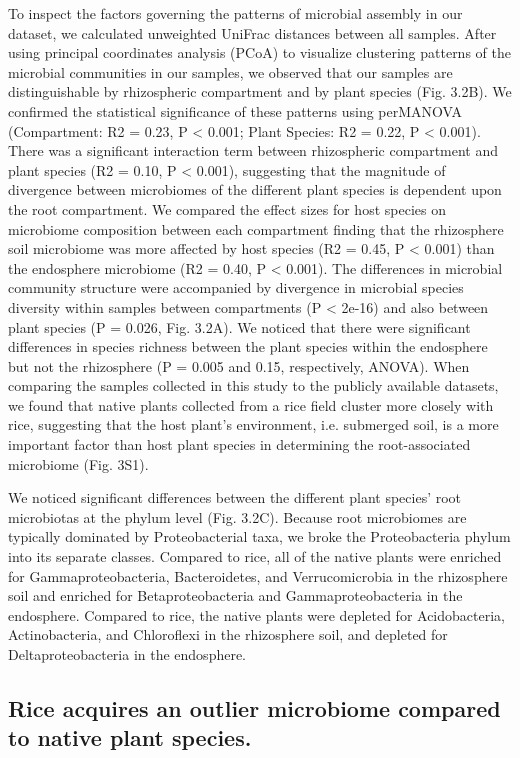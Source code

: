 To inspect the factors governing the patterns of microbial assembly in our dataset, we calculated unweighted UniFrac distances between all samples. After using principal coordinates analysis (PCoA) to visualize clustering patterns of the microbial communities in our samples, we observed that our samples are distinguishable by rhizospheric compartment and by plant species (Fig. 3.2B). We confirmed the statistical significance of these patterns using perMANOVA (Compartment: R2 = 0.23, P < 0.001; Plant Species: R2 = 0.22, P < 0.001). There was a significant interaction term between rhizospheric compartment and plant species (R2 = 0.10, P < 0.001), suggesting that the magnitude of divergence between microbiomes of the different plant species is dependent upon the root compartment. We compared the effect sizes for host species on microbiome composition between each compartment finding that the rhizosphere soil microbiome was more affected by host species (R2 = 0.45, P < 0.001) than the endosphere microbiome (R2 = 0.40, P < 0.001). The differences in microbial community structure were accompanied by divergence in microbial species diversity within samples between compartments (P < 2e-16) and also between plant species (P = 0.026, Fig. 3.2A). We noticed that there were significant differences in species richness between the plant species within the endosphere but not the rhizosphere (P = 0.005 and 0.15, respectively, ANOVA). When comparing the samples collected in this study to the publicly available datasets, we found that native plants collected from a rice field cluster more closely with rice, suggesting that the host plant's environment, i.e. submerged soil, is a more important factor than host plant species in determining the root-associated microbiome (Fig. 3S1).

We noticed significant differences between the different plant species' root microbiotas at the phylum level (Fig. 3.2C). Because root microbiomes are typically dominated by Proteobacterial taxa, we broke the Proteobacteria phylum into its separate classes. Compared to rice, all of the native plants were enriched for Gammaproteobacteria, Bacteroidetes, and Verrucomicrobia in the rhizosphere soil and enriched for Betaproteobacteria and Gammaproteobacteria in the endosphere. Compared to rice, the native plants were depleted for Acidobacteria, Actinobacteria, and Chloroflexi in the rhizosphere soil, and depleted for Deltaproteobacteria in the endosphere. 

\subsection{Rice acquires an outlier microbiome compared to native plant species.}

